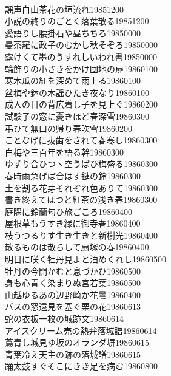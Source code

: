 \begin{multicols}{2}
\\謡声白山茶花の垣流れ\hfill{19851200}
\\小説の終りのごとく落葉散る\hfill{19851200}
\\愛語りし腰掛石や昼ちちろ\hfill{19850000}
\\曼茶羅に政子のむかし秋そぞろ\hfill{19850000}
\\露けくて墨のうすれしいわれ書\hfill{19850000}
\\輪飾りの小さきをかけ団地の扉\hfill{19860100}
\\寒木瓜の紅を深めて雨上る\hfill{19860100}
\\盆梅や鉢の木謡ひたき夜なり\hfill{19860100}
\\成人の日の背広着し子を見上ぐ\hfill{19860200}
\\試験子の窓に憂きほど春深雪\hfill{19860300}
\\弔ひて無口の帰り春吹雪\hfill{19860200}
\\ことなげに抜歯をされて春寒し\hfill{19860300}
\\白梅や三百年を語る幹\hfill{19860300}
\\ゆずり合ひつヽ空うばひ梅盛る\hfill{19860300}
\\春時雨急げば合はす鍵の鈴\hfill{19860300}
\\土を割る花芽それぞれ色ありて\hfill{19860300}
\\書き終えてほつと紅茶の浅き春\hfill{19860300}
\\庭隅に鈴蘭匂ひ旅ごころ\hfill{19860400}
\\屋根草もうすき緑に御寺春\hfill{19860400}
\\枝うつるりす生き生きと新樹光\hfill{19860400}
\\散るものは散らして扇塚の春\hfill{19860400}
\\明日に咲く牡丹見よと泊めくれし\hfill{19860500}
\\牡丹の今開かむと息づかひ\hfill{19860500}
\\身も心青く染まりぬ宮若葉\hfill{19860500}
\\山越ゆるあの辺野崎か花曇\hfill{19860400}
\\バスの窓遠見を塞ぐ栗の花\hfill{19860613}
\\蛇の衣板一枚の城跡文\hfill{19860614}
\\アイスクリーム売の熱弁落城譜\hfill{19860614}
\\蔦青し城見ゆ坂のオランダ塀\hfill{19860615}
\\青葉冷え天主の跡の落城譜\hfill{19860615}
\\踊太鼓すぐそこにきき足を病む\hfill{19860800}

\end{multicols}
